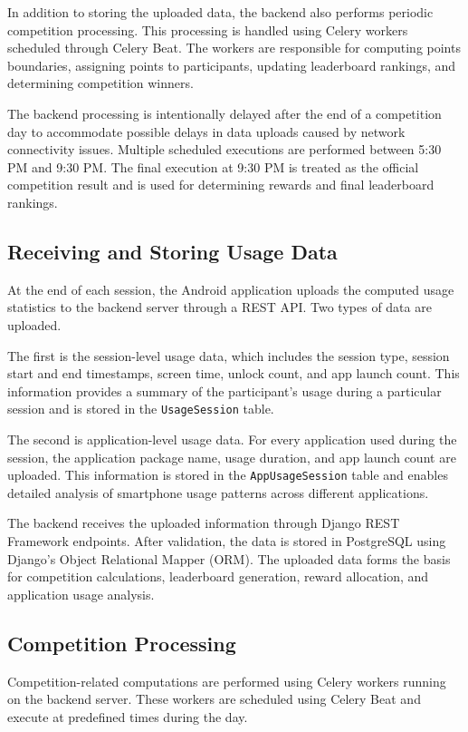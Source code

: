 \documentclass[11pt]{report}
\begin{document}
In addition to storing the uploaded data, the backend also performs periodic competition 
processing. This processing is handled using Celery workers scheduled through Celery Beat. 
The workers are responsible for computing points boundaries, assigning points to 
participants, updating leaderboard rankings, and determining competition winners.

The backend processing is intentionally delayed after the end of a competition day to 
accommodate possible delays in data uploads caused by network connectivity issues. 
Multiple scheduled executions are performed between 5:30 PM and 9:30 PM. The final 
execution at 9:30 PM is treated as the official competition result and is used for 
determining rewards and final leaderboard rankings.

\subsection{Receiving and Storing Usage Data}

At the end of each session, the Android application uploads the computed usage statistics 
to the backend server through a REST API. Two types of data are uploaded.

The first is the session-level usage data, which includes the session type, session start 
and end timestamps, screen time, unlock count, and app launch count. This information 
provides a summary of the participant's usage during a particular session and is stored 
in the \texttt{UsageSession} table.

The second is application-level usage data. For every application used during the session, 
the application package name, usage duration, and app launch count are uploaded. This 
information is stored in the \texttt{AppUsageSession} table and enables detailed analysis 
of smartphone usage patterns across different applications.

The backend receives the uploaded information through Django REST Framework endpoints. 
After validation, the data is stored in PostgreSQL using Django's Object Relational 
Mapper (ORM). The uploaded data forms the basis for competition calculations, 
leaderboard generation, reward allocation, and application usage analysis.

\subsection{Competition Processing}

Competition-related computations are performed using Celery workers running on the
backend server. These workers are scheduled using Celery Beat and execute at
predefined times during the day.
\end{document}
